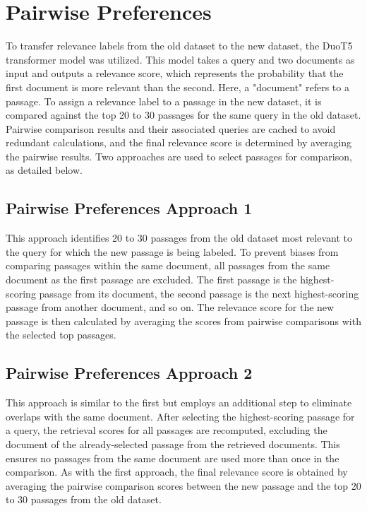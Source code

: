 \section{Pairwise Preferences}\label{pairwise-transfering-relevance-labels-across-datasets}

To transfer relevance labels from the old dataset to the new dataset, the DuoT5 transformer model was utilized. This model takes a query and two documents as input and outputs a relevance score, which represents the probability that the first document is more relevant than the second. Here, a "document" refers to a passage. To assign a relevance label to a passage in the new dataset, it is compared against the top 20 to 30 passages for the same query in the old dataset. Pairwise comparison results and their associated queries are cached to avoid redundant calculations, and the final relevance score is determined by averaging the pairwise results. Two approaches are used to select passages for comparison, as detailed below.

\subsection{Pairwise Preferences Approach 1}\label{pairwise-preferences-approach-1}

This approach identifies 20 to 30 passages from the old dataset most relevant to the query for which the new passage is being labeled. To prevent biases from comparing passages within the same document, all passages from the same document as the first passage are excluded. The first passage is the highest-scoring passage from its document, the second passage is the next highest-scoring passage from another document, and so on. The relevance score for the new passage is then calculated by averaging the scores from pairwise comparisons with the selected top passages.

\subsection{Pairwise Preferences Approach 2}\label{pairwise-preferences-approach-2}

This approach is similar to the first but employs an additional step to eliminate overlaps with the same document. After selecting the highest-scoring passage for a query, the retrieval scores for all passages are recomputed, excluding the document of the already-selected passage from the retrieved documents. This ensures no passages from the same document are used more than once in the comparison. As with the first approach, the final relevance score is obtained by averaging the pairwise comparison scores between the new passage and the top 20 to 30 passages from the old dataset.